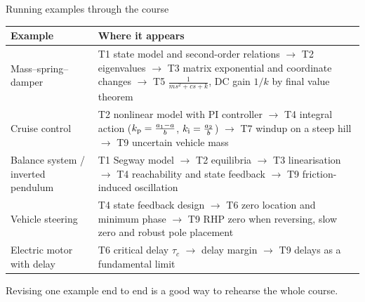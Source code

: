 \documentclass[10pt]{beamer-control}
\begin{document}
\begin{frame}{Running examples through the course}
  \begin{center}
    \scriptsize
    \renewcommand\arraystretch{1.45}
    \begin{tabular}{@{}p{2.1cm}p{9.0cm}@{}}
      \toprule
      \textbf{Example} & \textbf{Where it appears}\\
      \midrule
      Mass--spring--damper & T1 state model and second-order relations $\to$ T2 eigenvalues $\to$ T3 matrix exponential and coordinate changes $\to$ T5 $\frac{1}{ms^2+cs+k}$, DC gain $1/k$ by final value theorem\\
      Cruise control & T2 nonlinear model with PI controller $\to$ T4 integral action ($k_{\mathrm{p}}=\frac{a_1-a}{b}$, $k_{\mathrm{i}}=\frac{a_2}{b}$) $\to$ T7 windup on a steep hill $\to$ T9 uncertain vehicle mass\\
      Balance system / inverted pendulum & T1 Segway model $\to$ T2 equilibria $\to$ T3 linearisation $\to$ T4 reachability and state feedback $\to$ T9 friction-induced oscillation\\
      Vehicle steering & T4 state feedback design $\to$ T6 zero location and minimum phase $\to$ T9 RHP zero when reversing, slow zero and robust pole placement\\
      Electric motor with delay & T6 critical delay $\tau_c$ $\to$ delay margin $\to$ T9 delays as a fundamental limit\\
      \bottomrule
    \end{tabular}
  \end{center}
  \medskip
  \footnotesize
  Revising one example end to end is a good way to rehearse the whole course.
\end{frame}
\end{document}
